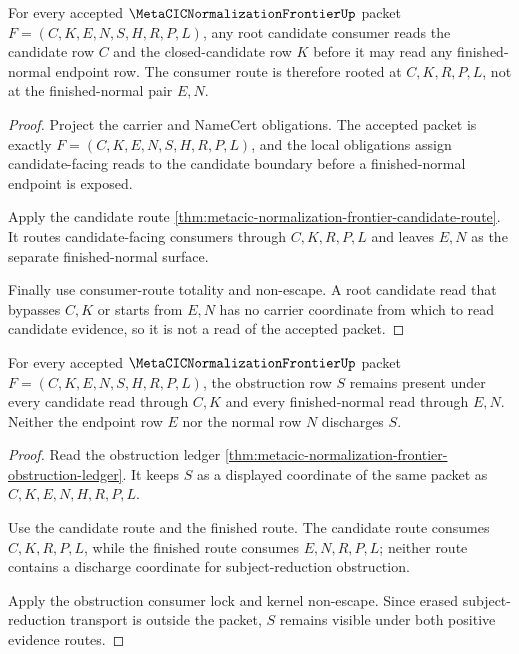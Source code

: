 \begin{theorem}
\label{thm:metacic-normalization-frontier-root-candidate-readback}
For every accepted $\MetaCICNormalizationFrontierUp$ packet
$F=(C,K,E,N,S,H,R,P,L)$, any root candidate consumer reads the candidate row
$C$ and the closed-candidate row $K$ before it may read any finished-normal
endpoint row. The consumer route is therefore rooted at $C,K,R,P,L$, not at
the finished-normal pair $E,N$.
\end{theorem}
\begin{proof}
Project the carrier and NameCert obligations. The accepted packet is exactly
$F=(C,K,E,N,S,H,R,P,L)$, and the local obligations assign candidate-facing
reads to the candidate boundary before a finished-normal endpoint is exposed.

Apply the candidate route
\autoref{thm:metacic-normalization-frontier-candidate-route}. It routes
candidate-facing consumers through $C,K,R,P,L$ and leaves $E,N$ as the
separate finished-normal surface.

Finally use consumer-route totality and non-escape. A root candidate read
that bypasses $C,K$ or starts from $E,N$ has no carrier coordinate from which
to read candidate evidence, so it is not a read of the accepted packet.
\end{proof}

\begin{theorem}
\label{thm:metacic-normalization-frontier-root-obstruction-retention}
For every accepted $\MetaCICNormalizationFrontierUp$ packet
$F=(C,K,E,N,S,H,R,P,L)$, the obstruction row $S$ remains present under every
candidate read through $C,K$ and every finished-normal read through $E,N$.
Neither the endpoint row $E$ nor the normal row $N$ discharges $S$.
\end{theorem}
\begin{proof}
Read the obstruction ledger
\autoref{thm:metacic-normalization-frontier-obstruction-ledger}. It keeps
$S$ as a displayed coordinate of the same packet as $C,K,E,N,H,R,P,L$.

Use the candidate route and the finished route. The candidate route consumes
$C,K,R,P,L$, while the finished route consumes $E,N,R,P,L$; neither route
contains a discharge coordinate for subject-reduction obstruction.

Apply the obstruction consumer lock and kernel non-escape. Since erased
subject-reduction transport is outside the packet, $S$ remains visible under
both positive evidence routes.
\end{proof}

